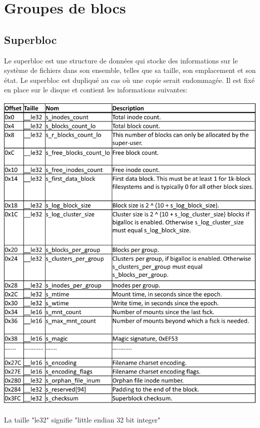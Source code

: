 \documentclass[12pt, letterpaper]{report}
\begin{document}
\section{Groupes de blocs}
\subsection{Superbloc}
Le superbloc est une structure de données qui stocke des informations sur le système de fichiers dans son ensemble, telles que sa taille, son emplacement et son état. Le superbloc est dupliqué au cas où une copie serait endommagée. Il est fixé en place sur le disque et contient les informations suivantes:

\begin{center}
	\includegraphics[width=\textwidth]{superbloc}
\end{center}
La taille "le32" signifie "little endian 32 bit integer"
\end{document}
